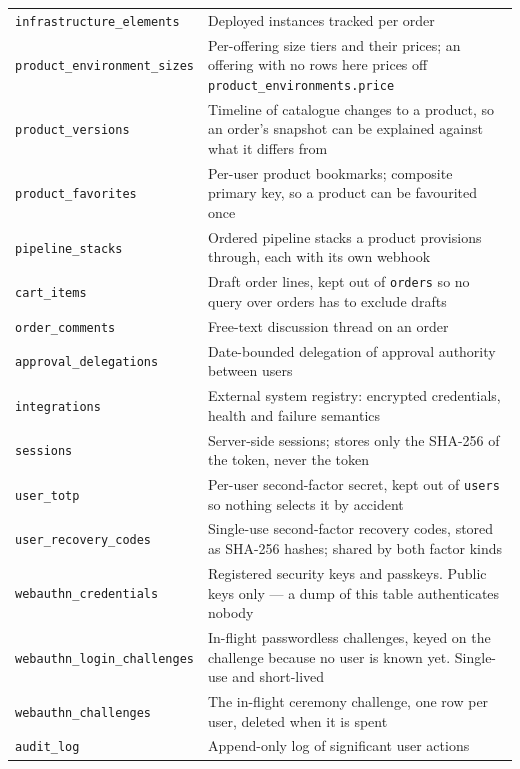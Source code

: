 \documentclass[12pt,a4paper,twoside]{report}
\newcommand{\code}[1]{\texttt{#1}}
\begin{document}
\begin{table}[H]
\begin{tabular}{@{}lp{9cm}@{}}
    \code{infrastructure\_elements} & Deployed instances tracked per order \\
    \code{product\_environment\_sizes} & Per-offering size tiers and their prices; an offering with no rows here prices off \code{product\_environments.price} \\
    \code{product\_versions}        & Timeline of catalogue changes to a product, so an order's snapshot can be explained against what it differs from \\
    \code{product\_favorites}       & Per-user product bookmarks; composite primary key, so a product can be favourited once \\
    \code{pipeline\_stacks}         & Ordered pipeline stacks a product provisions through, each with its own webhook \\
    \code{cart\_items}              & Draft order lines, kept out of \code{orders} so no query over orders has to exclude drafts \\
    \code{order\_comments}          & Free-text discussion thread on an order \\
    \code{approval\_delegations}    & Date-bounded delegation of approval authority between users \\
    \code{integrations}             & External system registry: encrypted credentials, health and failure semantics \\
    \code{sessions}                 & Server-side sessions; stores only the SHA-256 of the token, never the token \\
    \code{user\_totp}               & Per-user second-factor secret, kept out of \code{users} so nothing selects it by accident \\
    \code{user\_recovery\_codes}    & Single-use second-factor recovery codes, stored as SHA-256 hashes; shared by both factor kinds \\
    \code{webauthn\_credentials}    & Registered security keys and passkeys. Public keys only — a dump of this table authenticates nobody \\
    \code{webauthn\_login\_challenges} & In-flight passwordless challenges, keyed on the challenge because no user is known yet. Single-use and short-lived \\
    \code{webauthn\_challenges}     & The in-flight ceremony challenge, one row per user, deleted when it is spent \\
    \code{audit\_log}               & Append-only log of significant user actions \\

\end{tabular}
\end{table}
\end{document}
